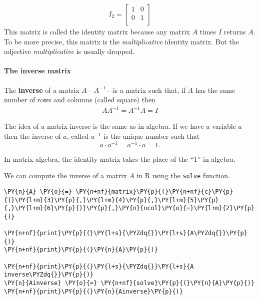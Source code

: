 \begin{align}
    I_{2} = \left [ \begin{matrix}
                        1 & 0 \\ 
                        0 & 1 \\
                     \end{matrix}
             \right ] 
\end{align} This matrix is called the identity matrix because any matrix
\(A\) times \(I\) returns \(A\). To be more precise, this matrix is the
\emph{multiplicative} identity matrix. But the adjective
\emph{multiplicative} is usually dropped.

\hypertarget{the-inverse-matrix}{%
\paragraph{The inverse matrix}\label{the-inverse-matrix}}

The \textbf{inverse} of a matrix \(A\)---\(A^{-1}\)---is a matrix such
that, if \(A\) has the same number of rows and columns (called square)
then \begin{align}
    A A^{-1} = A^{-1}A = I
\end{align}

The idea of a matrix inverse is the same as in algebra. If we have a
variable \(a\) then the inverse of \(a\), called \(a^{-1}\) is the
unique number such that \[ a \cdot a^{-1} = a^{-1} \cdot a = 1. \]

In matrix algebra, the identity matrix takes the place of the ``1'' in
algebra.

We can compute the inverse of a matrix \(A\) in R using the
\texttt{solve} function.

    \begin{tcolorbox}[breakable, size=fbox, boxrule=1pt, pad at break*=1mm,colback=cellbackground, colframe=cellborder]
\begin{Verbatim}[commandchars=\\\{\}]
\PY{n}{A} \PY{o}{=} \PY{n+nf}{matrix}\PY{p}{(}\PY{n+nf}{c}\PY{p}{(}\PY{l+m}{3}\PY{p}{,}\PY{l+m}{4}\PY{p}{,}\PY{l+m}{5}\PY{p}{,}\PY{l+m}{6}\PY{p}{)}\PY{p}{,}\PY{n}{ncol}\PY{o}{=}\PY{l+m}{2}\PY{p}{)}

\PY{n+nf}{print}\PY{p}{(}\PY{l+s}{\PYZdq{}}\PY{l+s}{A\PYZdq{}}\PY{p}{)}
\PY{n+nf}{print}\PY{p}{(}\PY{n}{A}\PY{p}{)}

\PY{n+nf}{print}\PY{p}{(}\PY{l+s}{\PYZdq{}}\PY{l+s}{A inverse\PYZdq{}}\PY{p}{)}
\PY{n}{Ainverse} \PY{o}{=} \PY{n+nf}{solve}\PY{p}{(}\PY{n}{A}\PY{p}{)}
\PY{n+nf}{print}\PY{p}{(}\PY{n}{Ainverse}\PY{p}{)}
\end{Verbatim}
\end{tcolorbox}

